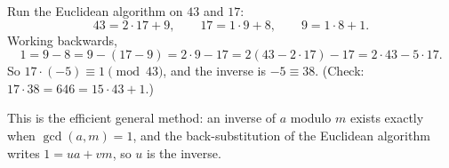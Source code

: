 Run the Euclidean algorithm on $43$ and $17$:
\[
43=2\cdot17+9,\qquad 17=1\cdot9+8,\qquad 9=1\cdot8+1 .
\]
Working backwards,
\[
1=9-8=9-(17-9)=2\cdot9-17=2(43-2\cdot17)-17=2\cdot43-5\cdot17 .
\]
So $17\cdot(-5)\equiv1\pmod{43}$, and the inverse is $-5\equiv\boxed{38}$. (Check: $17\cdot38=646=15\cdot43+1$.)

This is the efficient general method: an inverse of $a$ modulo $m$ exists exactly when $\gcd(a,m)=1$, and the back-substitution of the Euclidean algorithm writes $1=ua+vm$, so $u$ is the inverse.
